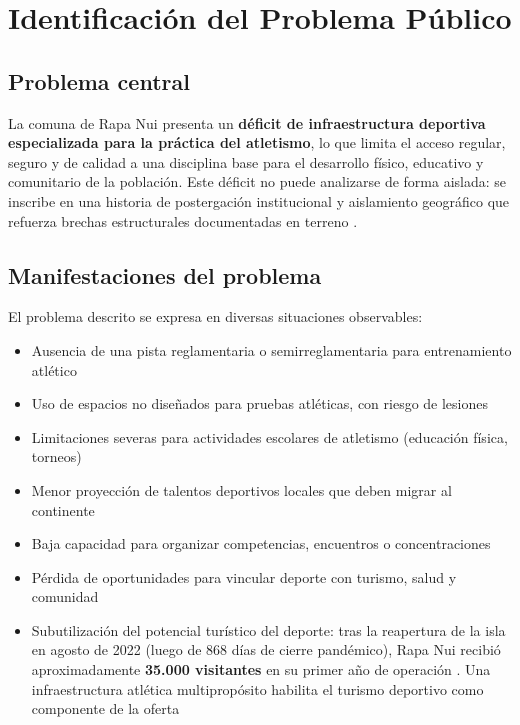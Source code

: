 \documentclass[12pt, a4paper]{article}
\begin{document}
\section{Identificación del Problema Público}

\subsection{Problema central}

La comuna de Rapa Nui presenta un \textbf{déficit de infraestructura deportiva
especializada para la práctica del atletismo}, lo que limita el acceso regular,
seguro y de calidad a una disciplina base para el desarrollo físico, educativo
y comunitario de la población. Este déficit no puede analizarse de forma aislada:
se inscribe en una historia de postergación institucional y aislamiento geográfico
que refuerza brechas estructurales documentadas en terreno \citep{ortega2026}.

\subsection{Manifestaciones del problema}

El problema descrito se expresa en diversas situaciones observables:

\begin{itemize}[leftmargin=*, itemsep=3pt]
  \item Ausencia de una pista reglamentaria o semirreglamentaria para entrenamiento atlético
  \item Uso de espacios no diseñados para pruebas atléticas, con riesgo de lesiones
  \item Limitaciones severas para actividades escolares de atletismo (educación física, torneos)
  \item Menor proyección de talentos deportivos locales que deben migrar al continente
  \item Baja capacidad para organizar competencias, encuentros o concentraciones
  \item Pérdida de oportunidades para vincular deporte con turismo, salud y comunidad
  \item Subutilización del potencial turístico del deporte: tras la reapertura de la
        isla en agosto de 2022 (luego de 868 días de cierre pandémico), Rapa Nui
        recibió aproximadamente \textbf{35.000 visitantes} en su primer año de
        operación \citep{TurismoRapaNui2023}. Una infraestructura atlética
        multipropósito habilita el turismo deportivo como componente de la oferta
\end{itemize}
\end{document}
